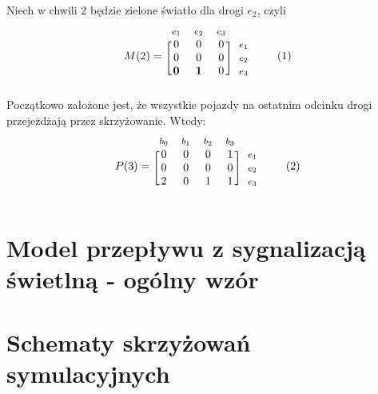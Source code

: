 \documentclass[12pt]{book}
\newcommand\addtag{\refstepcounter{equation}
\renewcommand{\labelenumii}{\theenumii}
\renewcommand{\theenumii}{\theenumi.\arabic{enumii}.}
\tag{\theequation}}
\begin{document}
Niech w chwili 2 będzie zielone światło dla drogi $e_2$, czyli
\begin{equation*}
  M(2)=
  \begin{blockarray}{*{3}{c} l}
    \begin{block}{*{3}{>{$\footnotesize}c<{$}} l}
     $e_1$ & $e_2$ & $e_3$\\
    \end{block}
    \begin{block}{[*{3}{c}]>{$\footnotesize}l<{$}}
       0 & 0 & 0 & $e_1$ \\
       0 & 0 & 0 & $e_2$ \\
       \textbf{0} & \textbf{1} & 0 & $e_3$ \\
    \end{block}
  \end{blockarray} \addtag
\end{equation*}
Początkowo założone jest, że wszystkie pojazdy na ostatnim odcinku drogi przejeżdżają przez skrzyżowanie. Wtedy:
\begin{equation*}
  P(3)=
  \begin{blockarray}{*{4}{c} l}
    \begin{block}{*{4}{>{$\footnotesize}c<{$}} l}
      $b_0$ & $b_1$ & $b_2$ & $b_3$ \\
    \end{block}
    \begin{block}{[*{4}{c}]>{$\footnotesize}l<{$}}
       0 & 0 & 0 & 1 & $e_1$ \\
       0 & 0 & 0 & 0 & $e_2$ \\
       2 & 0 & 1 & 1 & $e_3$ \\
    \end{block}
  \end{blockarray} \addtag \label{skrz_1_zmiennaStanu_0_sygnalizacja}
\end{equation*}

\section{Model przepływu z sygnalizacją świetlną - ogólny wzór}
\section{Schematy skrzyżowań symulacyjnych}
\end{document}
